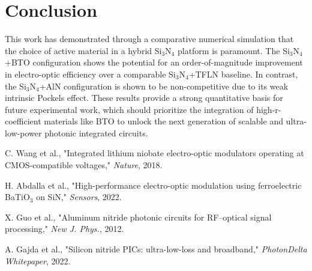 \documentclass[12pt, a4paper, numbers]{report}
\begin{document}
\chapter{Conclusion}
This work has demonstrated through a comparative numerical simulation that the choice of active material in a hybrid Si$_3$N$_4$ platform is paramount. The Si$_3$N$_4$+BTO configuration shows the potential for an order-of-magnitude improvement in electro-optic efficiency over a comparable Si$_3$N$_4$+TFLN baseline. In contrast, the Si$_3$N$_4$+AlN configuration is shown to be non-competitive due to its weak intrinsic Pockels effect. These results provide a strong quantitative basis for future experimental work, which should prioritize the integration of high-r-coefficient materials like BTO to unlock the next generation of scalable and ultra-low-power photonic integrated circuits.


\begin{thebibliography}{9}
C. Wang et al., "Integrated lithium niobate electro-optic modulators operating at CMOS-compatible voltages," \textit{Nature}, 2018.

H. Abdalla et al., "High-performance electro-optic modulation using ferroelectric BaTiO$_3$ on SiN," \textit{Sensors}, 2022.

X. Guo et al., "Aluminum nitride photonic circuits for RF–optical signal processing," \textit{New J. Phys.}, 2012.

A. Gajda et al., "Silicon nitride PICs: ultra-low-loss and broadband," \textit{PhotonDelta Whitepaper}, 2022.
\end{thebibliography}

\end{document}
